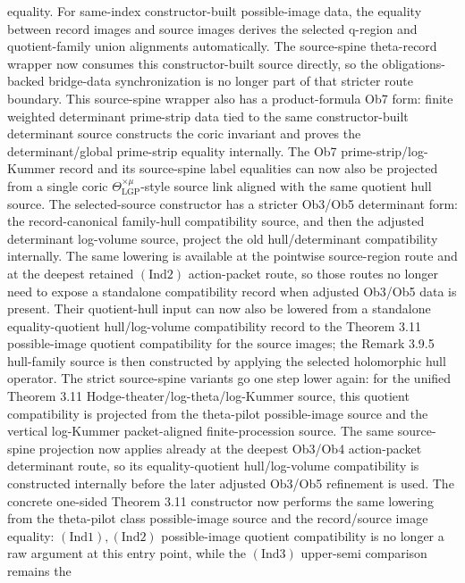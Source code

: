 \begin{proposition}
  equality.  For same-index constructor-built possible-image data, the equality
  between record images and source images derives the selected q-region and
  quotient-family union alignments automatically.  The source-spine theta-record
  wrapper now consumes this constructor-built source directly, so the
  obligations-backed bridge-data synchronization is no longer part of that
  stricter route boundary.  This source-spine wrapper also has a product-formula
  Ob7 form: finite weighted determinant prime-strip data tied to the same
  constructor-built determinant source constructs the coric invariant and proves
  the determinant/global prime-strip equality internally.  The Ob7
  prime-strip/log-Kummer record and its source-spine label
  equalities can now also be projected from a single coric
  \(\Theta^{\times\mu}_{\mathrm{LGP}}\)-style source link aligned with the same
  quotient hull source.  The selected-source constructor has a stricter
  Ob3/Ob5 determinant form: the record-canonical family-hull compatibility
  source, and then the adjusted determinant log-volume source, project the old
  hull/determinant compatibility internally.  The same lowering is available
  at the pointwise source-region route and at the deepest retained
  \((\mathrm{Ind}2)\) action-packet route, so those routes no longer need to
  expose a standalone compatibility record when adjusted Ob3/Ob5 data is
  present.  Their quotient-hull input can now also be lowered from a standalone
  equality-quotient hull/log-volume compatibility record to the Theorem 3.11
  possible-image quotient compatibility for the source images; the Remark 3.9.5
  hull-family source is then constructed by applying the selected holomorphic
  hull operator.  The strict source-spine variants go one step lower again:
  for the unified Theorem 3.11 Hodge-theater/log-theta/log-Kummer source, this
  quotient compatibility is projected from the theta-pilot possible-image
  source and the vertical log-Kummer packet-aligned finite-procession source.
  The same source-spine projection now applies already at the deepest Ob3/Ob4
  action-packet determinant route, so its equality-quotient hull/log-volume
  compatibility is constructed internally before the later adjusted Ob3/Ob5
  refinement is used.
  The concrete one-sided Theorem 3.11 constructor now performs the same
  lowering from the theta-pilot class possible-image source and the
  record/source image equality: \((\mathrm{Ind}1),(\mathrm{Ind}2)\)
  possible-image quotient compatibility is no longer a raw argument at this
  entry point, while the \((\mathrm{Ind}3)\) upper-semi comparison remains the

\end{proposition}
